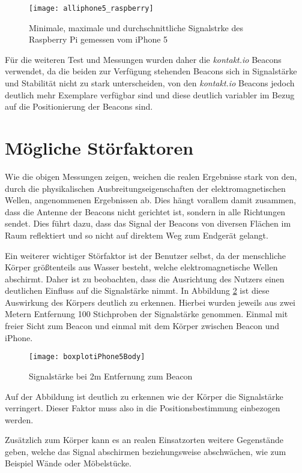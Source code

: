 \begin{figure}[htb!]
		\centering
	\texttt{[image: alliphone5\_raspberry]}
	\caption{Minimale, maximale und durchschnittliche Signalstrke des Raspberry Pi gemessen vom iPhone 5}
	\label{alliphone5_raspberry}
\end{figure}

Für die weiteren Test und Messungen wurden daher die \emph{kontakt.io} Beacons verwendet, da die beiden zur Verfügung stehenden Beacons sich in Signalstärke und Stabilität nicht zu stark unterscheiden, von den \emph{kontakt.io} Beacons jedoch deutlich mehr Exemplare verfügbar sind und diese deutlich variabler im Bezug auf die Positionierung der Beacons sind.


\section{Mögliche Störfaktoren}
\label{sec:dataandmeasurement:interferencefactor}
Wie die obigen Messungen zeigen, weichen die realen Ergebnisse stark von den, durch die physikalischen Ausbreitungseigenschaften der elektromagnetischen Wellen, angenommenen Ergebnissen ab. Dies hängt vorallem damit zusammen, dass die Antenne der Beacons nicht gerichtet ist, sondern in alle Richtungen sendet. Dies führt dazu, dass das Signal der Beacons von diversen Flächen im Raum reflektiert und so nicht auf direktem Weg zum Endgerät gelangt. 

Ein weiterer wichtiger Störfaktor ist der Benutzer selbst, da der menschliche Körper größtenteils aus Wasser besteht, welche elektromagnetische Wellen abschirmt. Daher ist zu beobachten, dass die Ausrichtung des Nutzers einen deutlichen Einfluss auf die Signalstärke nimmt. In Abbildung \ref{boxplotiPhone5Body} ist diese Auswirkung des Körpers deutlich zu erkennen. Hierbei wurden jeweils aus zwei Metern Entfernung 100 Stichproben der Signalstärke genommen. Einmal mit freier Sicht zum Beacon und einmal mit dem Körper zwischen Beacon und iPhone. 

\begin{figure}[htb!]
		\centering
	\texttt{[image: boxplotiPhone5Body]}
	\caption{Signalstärke bei 2m Entfernung zum Beacon}
	\label{boxplotiPhone5Body}
\end{figure}

Auf der Abbildung ist deutlich zu erkennen wie der Körper die Signalstärke verringert. Dieser Faktor muss also in die Positionsbestimmung einbezogen werden.

Zusätzlich zum Körper kann es an realen Einsatzorten weitere Gegenstände geben, welche das Signal abschirmen beziehungsweise abschwächen, wie zum Beispiel Wände oder Möbelstücke.